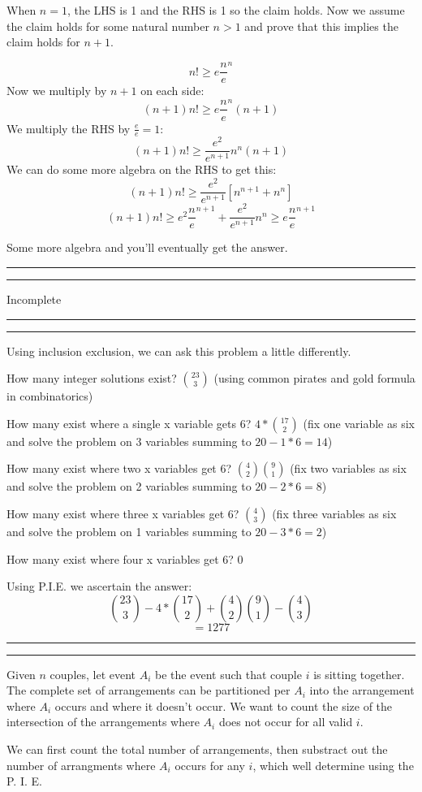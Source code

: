 \documentclass[11pt,letterpaper]{article}
\newcommand{\question}[2] {\vspace{.25in} \hrule\vspace{0.5em}
\noindent{\bf #1: #2} \vspace{0.5em}
\hrule \vspace{.10in}}
\begin{document}
When $n=1$, the LHS is 1 and the RHS is 1 so the claim holds.
Now we assume the claim holds for some natural number $n > 1$ and prove that this implies the claim holds for $n+1$.

$$n! \geq e \frac{n}{e}^n$$
Now we multiply by $n+1$ on each side:
$$(n+1)n! \geq e \frac{n}{e}^n (n+1)$$
We multiply the RHS by $\frac{e}{e} = 1$:
$$(n+1)n! \geq \frac{e^2}{e^{n+1}} n^{n} (n+1)$$
We can do some more algebra on the RHS to get this:
$$(n+1)n! \geq \frac{e^2}{e^{n+1}} [n^{n+1}+ n^{n}]$$
$$(n+1)n! \geq e^2 \frac{n}{e}^{n+1} + \frac{e^2}{e^{n+1}}  n^{n} \geq e \frac{n}{e}^{n+1}$$

Some more algebra and you'll eventually get the answer.



\question{5}{5}

Incomplete

\question{6}{6}
Using inclusion exclusion, we can ask this problem a little differently.

How many integer solutions exist? 
${ 23 \choose 3 }$ (using common pirates and gold formula in combinatorics)

How many exist where a single x variable gets 6?
$4 * { 17 \choose 2 }$ (fix one variable as six and solve the problem on 3 variables summing to $20-1*6 = 14$)

How many exist where two x variables get 6?
${ 4 \choose 2 } { 9 \choose 1 }$ (fix two variables as six and solve the problem on 2 variables summing to $20-2*6 = 8$)

How many exist where three x variables get 6?
${ 4 \choose 3 }$ (fix three variables as six and solve the problem on 1 variables summing to $20-3*6 = 2$)

How many exist where four x variables get 6?
0

Using P.I.E. we ascertain the answer:
$${ 23 \choose 3 } - 4 * { 17 \choose 2 } + { 4 \choose 2 } { 9 \choose 1 } - { 4 \choose 3 }$$
$$=1277$$



\question{7}{7}
Given $n$ couples, let event $A_i$ be the event such that couple $i$ is sitting together.
The complete set of arrangements can be partitioned per $A_i$ into the arrangement where $A_i$ occurs
and where it doesn't occur. We want to count the size of the intersection of the arrangements
where $A_i$ does not occur for all valid $i$.

We can first count the total number of arrangements, then substract out the number of arrangments where $A_i$
occurs for any $i$, which well determine using the P. I. E.
\end{document}
